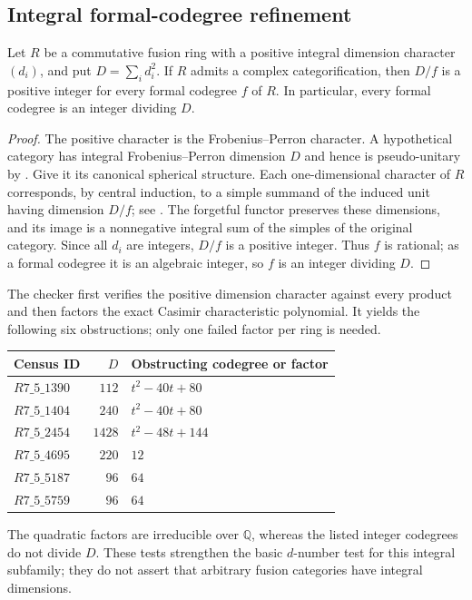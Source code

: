 \subsection{Integral formal-codegree refinement}
\begin{proposition}\label{prop:m5-integral-codegree}
Let $R$ be a commutative fusion ring with a positive integral dimension
character $(d_i)$, and put $D=\sum_i d_i^2$.
If $R$ admits a complex categorification, then $D/f$ is a positive
integer for every formal codegree $f$ of $R$.
In particular, every formal codegree is an integer dividing $D$.
\end{proposition}
\begin{proof}
The positive character is the Frobenius--Perron character. A hypothetical
category has integral Frobenius--Perron dimension $D$ and hence is
pseudo-unitary by \cite[Proposition 8.24]{ENO}. Give it its canonical
spherical structure. Each one-dimensional character of $R$ corresponds,
by central induction, to a simple summand of the induced unit having
dimension $D/f$; see \cite[Theorem 2.13]{OstrikRank3}.
The forgetful functor preserves these dimensions, and its image is a
nonnegative integral sum of the simples of the original category. Since
all $d_i$ are integers, $D/f$ is a positive integer. Thus $f$ is rational;
as a formal codegree it is an algebraic integer, so $f$ is an integer
dividing $D$.
\end{proof}

The checker first verifies the positive dimension character against every
product and then factors the exact Casimir characteristic polynomial.
It yields the following six obstructions; only one failed factor per
ring is needed.
\begin{center}\small
\begin{tabular}{@{}l r l@{}}
\toprule
Census ID & $D$ & Obstructing codegree or factor\\
\midrule
$R7\_5\_1390$ & $112$ & $t^2-40t+80$\\
$R7\_5\_1404$ & $240$ & $t^2-40t+80$\\
$R7\_5\_2454$ & $1428$ & $t^2-48t+144$\\
$R7\_5\_4695$ & $220$ & $12$\\
$R7\_5\_5187$ & $96$ & $64$\\
$R7\_5\_5759$ & $96$ & $64$\\
\bottomrule
\end{tabular}
\end{center}
The quadratic factors are irreducible over $\mathbb Q$, whereas the
listed integer codegrees do not divide $D$. These tests strengthen the
basic $d$-number test for this integral subfamily; they do not assert
that arbitrary fusion categories have integral dimensions.

